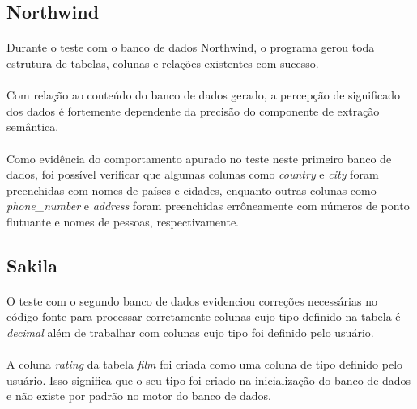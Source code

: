 \subsection{Northwind}

\paragraph{} Durante o teste com o banco de dados Northwind, o programa gerou toda estrutura de tabelas, colunas e relações existentes com sucesso.

\paragraph{} Com relação ao conteúdo do banco de dados gerado, a percepção de significado dos dados é fortemente dependente da precisão do componente de extração semântica.

\paragraph{} Como evidência do comportamento apurado no teste neste primeiro banco de dados, foi possível verificar que algumas colunas como \textit{country} e \textit{city} foram preenchidas com nomes de países e cidades, enquanto outras colunas como \textit{phone\_number} e \textit{address} foram preenchidas errôneamente com números de ponto flutuante e nomes de pessoas, respectivamente.

\subsection{Sakila}

\paragraph{} O teste com o segundo banco de dados evidenciou correções necessárias no código-fonte para processar corretamente colunas cujo tipo definido na tabela é \textit{decimal} além de trabalhar com colunas cujo tipo foi definido pelo usuário.

\paragraph{} A coluna \textit{rating} da tabela \textit{film} foi criada como uma coluna de tipo definido pelo usuário. Isso significa que o seu tipo foi criado na inicialização do banco de dados e não existe por padrão no motor do banco de dados.


